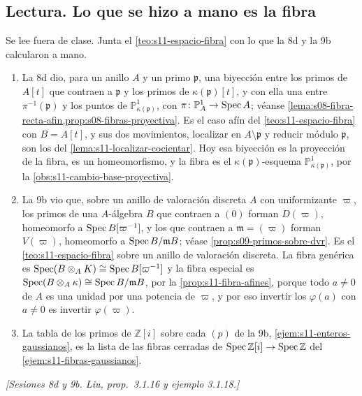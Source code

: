 \subsection{Lectura. Lo que se hizo a mano es la fibra}

Se lee fuera de clase. Junta el \cref{teo:s11-espacio-fibra} con lo que la 8d y la 9b calcularon a mano.

\begin{obs}
\label{obs:s11-mano-es-fibra}
\begin{enumerate}[label=(\alph*)]
\item La 8d dio, para un anillo \(A\) y un primo \(\mathfrak p\), una biyección entre los primos de \(A[t]\) que contraen a \(\mathfrak p\) y los primos de \(\kappa(\mathfrak p)[t]\), y con ella una entre \(\pi^{-1}(\mathfrak p)\) y los puntos de \(\mathbb P^1_{\kappa(\mathfrak p)}\), con \(\pi\colon\mathbb P^1_A\to\operatorname{Spec} A\); véanse \cref{lema:s08-fibra-recta-afin,prop:s08-fibras-proyectiva}. Es el caso afín del \cref{teo:s11-espacio-fibra} con \(B=A[t]\), y sus dos movimientos, localizar en \(A\setminus\mathfrak p\) y reducir módulo \(\mathfrak p\), son los del \cref{lema:s11-localizar-cocientar}. Hoy esa biyección es la proyección de la fibra, es un homeomorfismo, y la fibra es el \(\kappa(\mathfrak p)\)-esquema \(\mathbb P^1_{\kappa(\mathfrak p)}\), por la \cref{obs:s11-cambio-base-proyectiva}.
\item La 9b vio que, sobre un anillo de valoración discreta \(A\) con uniformizante \(\varpi\), los primos de una \(A\)-álgebra \(B\) que contraen a \((0)\) forman \(D(\varpi)\), homeomorfo a \(\operatorname{Spec} B[\varpi^{-1}]\), y los que contraen a \(\mathfrak m=(\varpi)\) forman \(V(\varpi)\), homeomorfo a \(\operatorname{Spec} B/\mathfrak mB\); véase \cref{prop:s09-primos-sobre-dvr}. Es el \cref{teo:s11-espacio-fibra} sobre un anillo de valoración discreta. La fibra genérica es \(\operatorname{Spec}(B\otimes_AK)\cong\operatorname{Spec} B[\varpi^{-1}]\) y la fibra especial es \(\operatorname{Spec}(B\otimes_A\kappa)\cong\operatorname{Spec} B/\mathfrak mB\), por la \cref{prop:s11-fibra-afines}, porque todo \(a\ne0\) de \(A\) es una unidad por una potencia de \(\varpi\), y por eso invertir los \(\varphi(a)\) con \(a\ne0\) es invertir \(\varphi(\varpi)\).
\item La tabla de los primos de \(\mathbb Z[i]\) sobre cada \((p)\) de la 9b, \cref{ejem:s11-enteros-gaussianos}, es la lista de las fibras cerradas de \(\operatorname{Spec}\mathbb Z[i]\to\operatorname{Spec}\mathbb Z\) del \cref{ejem:s11-fibras-gaussianos}.
\end{enumerate}
\emph{[Sesiones 8d y 9b. Liu, prop.~3.1.16 y ejemplo 3.1.18.]}
\end{obs}


